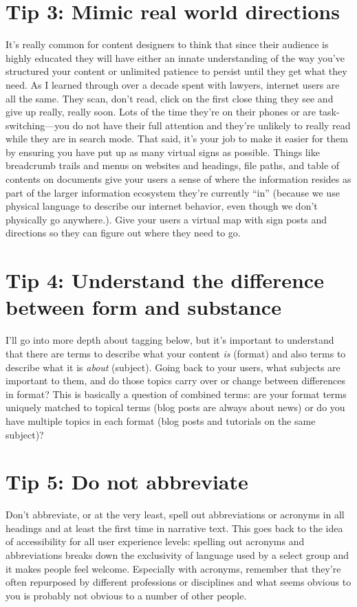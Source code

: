 \documentclass[10pt,letterpaper]{article}
\newcommand{\rulemajor}[1]{\section*{#1}}
\begin{document}
\rulemajor{Tip 3: Mimic real world directions}

It's really common for content designers to think that since their audience is highly educated
they will have either an innate understanding of the way you've structured your content
or unlimited patience to persist until they get what they need.
As I learned through over a decade spent with lawyers, internet users are all the same.
They scan, don't read, click on the first close thing they see and give up really, really soon.
Lots of the time they're on their phones or are task-switching---you do not have their full attention
and they're unlikely to really read while they are in search mode.
That said,
it's your job to make it easier for them by ensuring you have put up as many virtual signs as possible.
Things like breadcrumb trails and menus on websites and headings, file paths, and table of contents on documents
give your users a sense of where the information resides
as part of the larger information ecosystem they're currently ``in''
(because we use physical language to describe our internet behavior, even though we don't physically go anywhere.).
Give your users a virtual map with sign posts and directions so they can figure out where they need to go.

\rulemajor{Tip 4: Understand the difference between form and substance}

I'll go into more depth about tagging below,
but it's important to understand that there are terms to describe what your content \emph{is} (format)
and also terms to describe what it is \emph{about} (subject).
Going back to your users,
what subjects are important to them,
and do those topics carry over or change between differences in format?
This is basically a question of combined terms:
are your format terms uniquely matched to topical terms (blog posts are always about news)
or do you have multiple topics in each format (blog posts and tutorials on the same subject)?

\rulemajor{Tip 5: Do not abbreviate}

Don't abbreviate,
or at the very least,
spell out abbreviations or acronyms in all headings and at least the first time in narrative text.
This goes back to the idea of accessibility for all user experience levels:
spelling out acronyms and abbreviations breaks down the exclusivity of language used by a select group and it makes people feel welcome.
Especially with acronyms,
remember that they're often repurposed by different professions or disciplines
and what seems obvious to you is probably not obvious to a number of other people.
\end{document}
